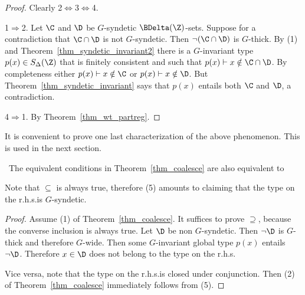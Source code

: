 \begin{proof}
  Clearly 2$\Leftrightarrow$3$\Leftrightarrow$4.

  1$\Rightarrow$2.
  Let $\C$ and $\D$ be $G$-syndetic $\BDelta({\Z})$-sets.
  Suppose for a contradiction that $\C\cap\D$ is not $G$-syndetic.
  Then $\neg(\C\cap\D)$ is $G$-thick.
  By (1) and Theorem~\ref{thm_syndetic_invariant2} there is a $G$-invariant type $p(x)\in S_\Delta(\Z)$ that is finitely consistent and such that $p(x)\vdash x\notin\C\cap\D$.
  By completeness either $p(x)\vdash x\notin\C$ or $p(x)\vdash x\notin\D$.
  But Theorem~\ref{thm_syndetic_invariant} says that $p(x)$ entails both $\C$ and $\D$, a contradiction.


  4$\Rightarrow$1. By Theorem~\ref{thm_wt_partreg}.
\end{proof}

It is convenient to prove one last characterization of the above phenomenon.
This is used in the next section. 

\begin{proposition}\label{prop_coalese}\ 
  The equivalent conditions in Theorem~\ref{thm_coalesce} are also equivalent to\smallskip

\end{proposition}

Note that $\subseteq$ is always true, therefore (5) amounts to claiming that the type on the r.h.s.\@ is $G$-syndetic.
\begin{proof} 
  Assume (1) of Theorem~\ref{thm_coalesce}.
  It suffices to prove $\supseteq$, because the converse inclusion is always true. 
  Let $\D$ be non $G$-syndetic.
  Then $\neg\D$ is $G$-thick and therefore $G$-wide.
  Then some $G$-invariant global type $p(x)$ entails $\neg\D$.
  Therefore $x\in\D$ does not belong to the type on the r.h.s.
  
  Vice versa, note that the type on the r.h.s.\@ is closed under conjunction.
  Then (2) of Theorem~\ref{thm_coalesce} immediately follows from (5).
\end{proof}



